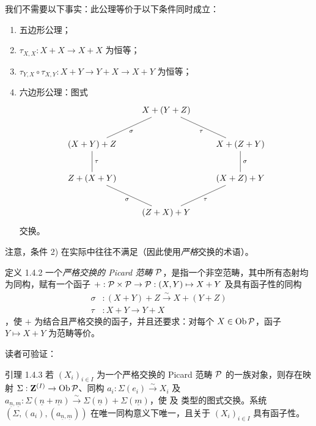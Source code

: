 我们不需要以下事实：此公理等价于以下条件同时成立： \begin{enumerate} \renewcommand{\labelenumi}{\theenumi)} \item 五边形公理；

\item $\tau_{X,X}:X+X\rightarrow X+X$ 为恒等；

\item $\tau_{Y,X}\circ\tau_{X,Y}:X+Y\rightarrow Y+X\rightarrow X+Y$ 为恒等；

\item 六边形公理：图式 $$
\xymatrix{
          &     X + (Y + Z)                 &\\
 (X+Y)+Z  \ar@{-}[ru]_{\sigma} \ar@{-}[d]^{\tau}& & X+(Z+Y)\ar@{-}[lu]^{\tau}\\
Z+(X+Y) \ar@{-}[rd]_{\sigma}  &  & (X+Z) + Y \ar@{-}[u]_{\sigma}\\
          &    (Z+X)+Y    \ar@{-}[ru]_{\tau}                  &
}
$$ \pageoriginale 交换。 \end{enumerate}

注意，条件 2) 在实际中往往不满足（因此使用\emph{严格}交换的术语）。

\hypertarget{sga4.exp.XVIII.definition.1.4.2}{}\begin{enonce*}{定义 1.4.2} 一个\emph{严格交换的 Picard 范畴 ${\mathcal P}$}，是指一个非空范畴，其中所有态射均为同构，赋有一个函子 $+:{\mathcal P}\times
{\mathcal P}\rightarrow {\mathcal P}:(X,Y)\mapsto X+Y$ 及具有函子性的同构 \begin{align*}
\sigma &: (X+Y)+Z\xrightarrow{\sim} X+(Y+Z)\\
\tau &: X+Y\longrightarrow Y+X
\end{align*}，使 $+$ 为结合且严格交换的函子，并且还要求：对每个 $X\in \operatorname{Ob} {\mathcal P}$，函子 $Y\mapsto X+Y$ 为范畴等价。 \end{enonce*}

读者可验证：

\hypertarget{sga4.exp.XVIII.lemma.1.4.3}{}\begin{enonce*}{引理 1.4.3} 若 $(X_{i})_{i\in I}$ 为一个严格交换的 Picard 范畴 ${\mathcal P}$ 的一族对象，则存在映射 $\Sigma:\mathbf{Z}^{(I)}\rightarrow \operatorname{Ob} {\mathcal P}$、同构 $a_{i}:\Sigma(e_{i})\xrightarrow{\sim} X_{i}$ 及 $a_{\underline{n},\underline{m}}:\Sigma(\underline{n}+\underline{m})
\xrightarrow{\sim}\Sigma(\underline{n})+\Sigma(\underline{m})$，使  及  类型的图式交换。系统 $(\Sigma,(a_{i}),(a_{\underline{n},\underline{m}}))$ 在唯一同构意义下唯一，且关于 $(X_{i})_{i\in I}$ 具有函子性。 \end{enonce*}


